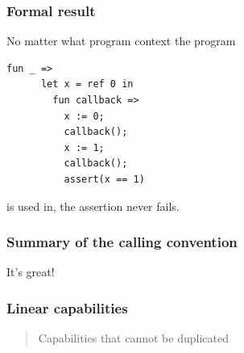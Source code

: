 \documentclass[14pt]{beamer}
\begin{document}
\begin{frame}[fragile]
  \frametitle{Formal result}
    \begin{lemma}
No matter what program context the program
    \begin{lstlisting}[basicstyle=\small\ttfamily,escapeinside=||,keywords={fun, let, in, ref, assert}]
    fun _ => 
      let x = ref 0 in
        fun callback =>
          x := 0;
          callback();
          x := 1;
          callback();
          assert(x == 1)
    \end{lstlisting}
\vspace{-1em}
is used in, the assertion never fails.
  \end{lemma}
\end{frame}

\begin{frame}
  \frametitle{Summary of the calling convention}
  \huge It's great!\\
    \begin{flushright}
  \end{flushright}
\end{frame}


\begin{frame}
  \frametitle{Linear capabilities}
  \begin{quote}
    \large
    Capabilities that cannot be duplicated
  \end{quote}
\end{frame}
\end{document}
